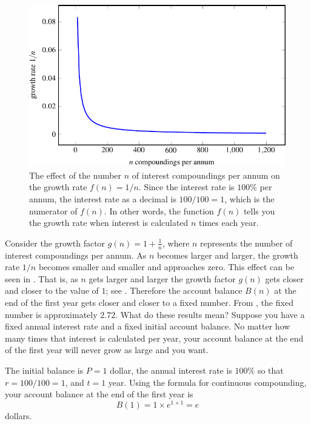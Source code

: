 \documentclass[a4paper,oneside,12pt]{article}
\begin{document}
\begin{problem}
{\begin{solution}
\begin{figure}[!htbp]
\centering
\includegraphics[scale=1.1]{image/11/e-1200-growth-rate.pdf}
\caption{%
  The effect of the number $n$ of interest compoundings per annum on
  the growth rate $f(n) = 1 / n$.  Since the interest rate is $100\%$
  per annum, the interest rate as a decimal is $100 / 100 = 1$, which
  is the numerator of $f(n)$.  In other words, the function $f(n)$
  tells you the growth rate when interest is calculated $n$ times each
  year.
}
\label{fig:e_saving_1200_growth_rate}
\end{figure}

Consider the growth factor $g(n) = 1 + \frac{1}{n}$, where $n$
represents the number of interest compoundings per annum.  As $n$
becomes larger and larger, the growth rate $1 / n$ becomes smaller and
smaller and approaches zero.  This effect can be seen in
.  That is, as $n$ gets larger
and larger the growth factor $g(n)$ gets closer and closer to the
value of $1$; see .
Therefore the account balance $B(n)$ at the end of the first year gets
closer and closer to a fixed number.  From
, the fixed number is
approximately $2.72$.  What do these results mean?  Suppose you have a
fixed annual interest rate and a fixed initial account balance.  No
matter how many times that interest is calculated per year, your
account balance at the end of the first year will never grow as large
and you want.

The initial balance is $P = 1$ dollar, the annual interest rate is
$100\%$ so that $r = 100 / 100 = 1$, and $t = 1$ year.  Using the
formula for continuous compounding, your account balance at the end of
the first year is
\[
B(1)
=
1 \times e^{1 \times 1}
=
e
\]
dollars.
\end{solution}
}{}


\end{problem}
\end{document}
